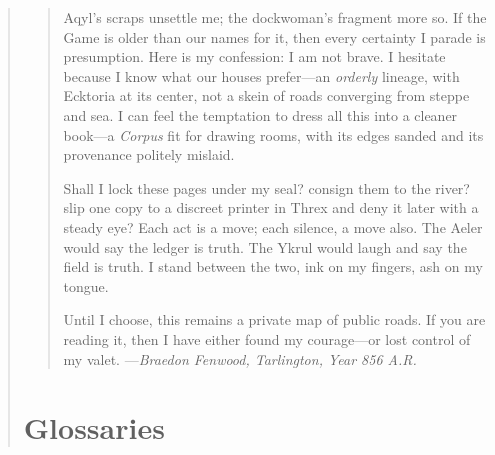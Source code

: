 \documentclass[11pt]{article}
\begin{document}
\begin{quote}
\begin{quote}
Aqyl’s scraps unsettle me; the dockwoman’s fragment more so. If the Game is older than our names for it, then every certainty I parade is presumption. Here is my confession: I am not brave. I hesitate because I know what our houses prefer—an \emph{orderly} lineage, with Ecktoria at its center, not a skein of roads converging from steppe and sea. I can feel the temptation to dress all this into a cleaner book—a \emph{Corpus} fit for drawing rooms, with its edges sanded and its provenance politely mislaid.

Shall I lock these pages under my seal? consign them to the river? slip one copy to a discreet printer in Threx and deny it later with a steady eye? Each act is a move; each silence, a move also. The Aeler would say the ledger is truth. The Ykrul would laugh and say the field is truth. I stand between the two, ink on my fingers, ash on my tongue.

Until I choose, this remains a private map of public roads. If you are reading it, then I have either found my courage—or lost control of my valet.
\hfill---\textit{Braedon Fenwood, Tarlington, Year 856 A.R.}
\end{quote}

\clearpage

\section{Glossaries}

\end{quote}
\end{document}
